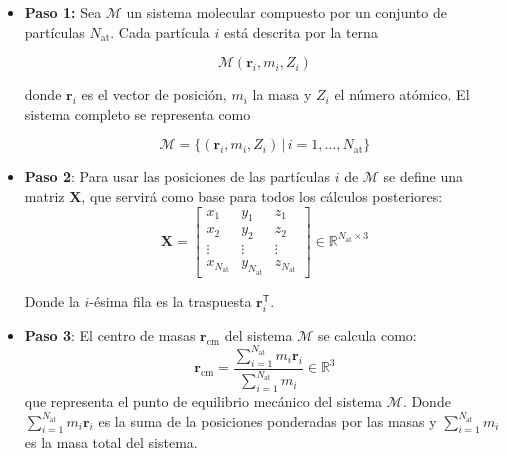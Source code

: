 	\begin{itemize}
		\item \textbf{Paso 1:}
		Sea $\mathcal{M}$ un sistema molecular compuesto por un conjunto de partículas $N_{\text{at}}$. Cada partícula $i$ está descrita por la terna 
		
		\begin{equation}
			\mathcal{M} (\mathbf{r}_i, m_i, Z_i)
		\end{equation}
		
		donde $\mathbf{r}_i$ es el vector de posición, $m_i$ la masa y $Z_i$ el número atómico. El sistema completo se representa como	
		
		\begin{equation}
			\mathcal{M} = \bigl\{(\mathbf{r}_i, m_i, Z_i) \,\big|\, i = 1,\dots,N_{\text{at}}\bigr\}
		\end{equation}
	
		\item \textbf{Paso 2}: Para usar las posiciones de las partículas $i$ de $\mathcal{M}$ se define una matriz $\mathbf{X}$, que servirá como base para todos los cálculos posteriores:
		\begin{equation}
			\mathbf{X} = \begin{bmatrix}
				x_1 & y_1 & z_1 \\
				x_2 & y_2 & z_2 \\
				\vdots & \vdots & \vdots \\
				x_{N_{\text{at}}} & y_{N_{\text{at}}} & z_{N_{\text{at}}}
			\end{bmatrix} \in \mathbb{R}^{N_{\text{at}} \times 3}
		\end{equation}
		
		Donde la $i$-ésima fila es la traspuesta $\mathbf{r}_i^{\mathsf T}$.
		
		
		\item \textbf{Paso 3}: El centro de masas $\mathbf{r}_{\text{cm}}$ del sistema $\mathcal{M}$ se calcula como:
		\begin{equation}
			\mathbf{r}_{\text{cm}}
			= \frac{\displaystyle \sum_{i=1}^{N_{\text{at}}} m_i \mathbf{r}_i}
			{\displaystyle \sum_{i=1}^{N_{\text{at}}} m_i}
			\in \mathbb{R}^3
		\end{equation}
		que representa el punto de equilibrio mecánico del sistema $\mathcal{M}$. 
		Donde $\displaystyle \sum_{i=1}^{N_{\text{at}}} m_i \mathbf{r}_i$ es la suma de la posiciones ponderadas por las masas y $\displaystyle \sum_{i=1}^{N_{\text{at}}} m_i$ es la masa total del sistema.
		

\end{itemize}
